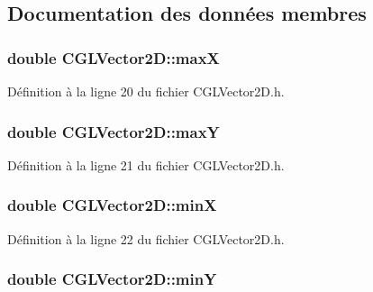 \subsection{Documentation des données membres}
\hypertarget{class_c_g_l_vector2_d_a595735d534849dee6d8bc0dc52f9a880}{
\subsubsection[{max\-X}]{\setlength{\rightskip}{0pt plus 5cm}double C\-G\-L\-Vector2\-D\-::max\-X\hspace{0.3cm}{\ttfamily [protected]}}}\label{class_c_g_l_vector2_d_a595735d534849dee6d8bc0dc52f9a880}


Définition à la ligne 20 du fichier C\-G\-L\-Vector2\-D.\-h.

\hypertarget{class_c_g_l_vector2_d_a2e1dce8591a104c2661293c9e50a939d}{
\subsubsection[{max\-Y}]{\setlength{\rightskip}{0pt plus 5cm}double C\-G\-L\-Vector2\-D\-::max\-Y\hspace{0.3cm}{\ttfamily [protected]}}}\label{class_c_g_l_vector2_d_a2e1dce8591a104c2661293c9e50a939d}


Définition à la ligne 21 du fichier C\-G\-L\-Vector2\-D.\-h.

\hypertarget{class_c_g_l_vector2_d_ad5d68c7cfa15cd7d468c11dbded6e01e}{
\subsubsection[{min\-X}]{\setlength{\rightskip}{0pt plus 5cm}double C\-G\-L\-Vector2\-D\-::min\-X\hspace{0.3cm}{\ttfamily [protected]}}}\label{class_c_g_l_vector2_d_ad5d68c7cfa15cd7d468c11dbded6e01e}


Définition à la ligne 22 du fichier C\-G\-L\-Vector2\-D.\-h.

\hypertarget{class_c_g_l_vector2_d_aa53b6bf4a0c08c67e0b9bfd4c7b1df87}{
\subsubsection[{min\-Y}]{\setlength{\rightskip}{0pt plus 5cm}double C\-G\-L\-Vector2\-D\-::min\-Y\hspace{0.3cm}{\ttfamily [protected]}}}\label{class_c_g_l_vector2_d_aa53b6bf4a0c08c67e0b9bfd4c7b1df87}


